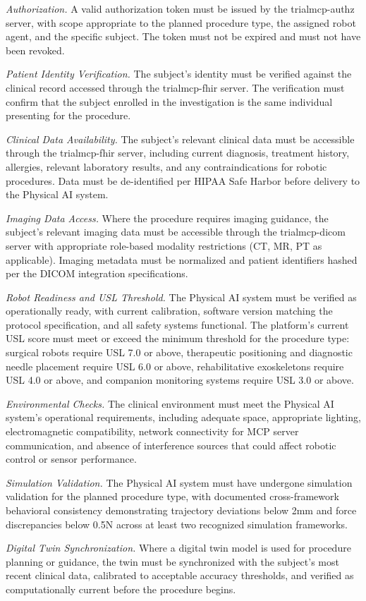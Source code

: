 \begin{description}[leftmargin=1.0cm,style=sameline]
\item[(1)] \textit{Authorization.} A valid authorization token must be issued by the trialmcp-authz server, with scope appropriate to the planned procedure type, the assigned robot agent, and the specific subject. The token must not be expired and must not have been revoked.
\item[(2)] \textit{Patient Identity Verification.} The subject's identity must be verified against the clinical record accessed through the trialmcp-fhir server. The verification must confirm that the subject enrolled in the investigation is the same individual presenting for the procedure.
\item[(3)] \textit{Clinical Data Availability.} The subject's relevant clinical data must be accessible through the trialmcp-fhir server, including current diagnosis, treatment history, allergies, relevant laboratory results, and any contraindications for robotic procedures. Data must be de-identified per HIPAA Safe Harbor before delivery to the Physical AI system.
\item[(4)] \textit{Imaging Data Access.} Where the procedure requires imaging guidance, the subject's relevant imaging data must be accessible through the trialmcp-dicom server with appropriate role-based modality restrictions (CT, MR, PT as applicable). Imaging metadata must be normalized and patient identifiers hashed per the DICOM integration specifications.
\item[(5)] \textit{Robot Readiness and USL Threshold.} The Physical AI system must be verified as operationally ready, with current calibration, software version matching the protocol specification, and all safety systems functional. The platform's current USL score must meet or exceed the minimum threshold for the procedure type: surgical robots require USL 7.0 or above, therapeutic positioning and diagnostic needle placement require USL 6.0 or above, rehabilitative exoskeletons require USL 4.0 or above, and companion monitoring systems require USL 3.0 or above.
\item[(6)] \textit{Environmental Checks.} The clinical environment must meet the Physical AI system's operational requirements, including adequate space, appropriate lighting, electromagnetic compatibility, network connectivity for MCP server communication, and absence of interference sources that could affect robotic control or sensor performance.
\item[(7)] \textit{Simulation Validation.} The Physical AI system must have undergone simulation validation for the planned procedure type, with documented cross-framework behavioral consistency demonstrating trajectory deviations below 2mm and force discrepancies below 0.5N across at least two recognized simulation frameworks.
\item[(8)] \textit{Digital Twin Synchronization.} Where a digital twin model is used for procedure planning or guidance, the twin must be synchronized with the subject's most recent clinical data, calibrated to acceptable accuracy thresholds, and verified as computationally current before the procedure begins.
\end{description}

